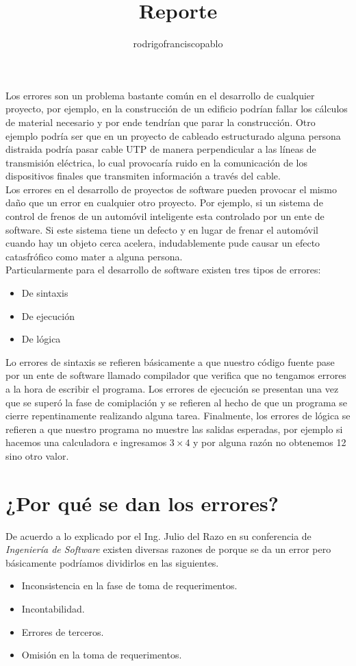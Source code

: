 \documentclass{mylib/reporteCorto}
\title{Reporte}
\author{rodrigofranciscopablo }
\begin{document}
\coverPage

Los errores son un problema bastante común en el desarrollo de cualquier proyecto, por ejemplo, en la construcción de un edificio podrían fallar los cálculos de material necesario y por ende tendrían que parar la construcción. Otro ejemplo podría ser que en un proyecto de cableado estructurado alguna persona distraida podría pasar cable UTP de manera perpendicular a las líneas de transmisión eléctrica, lo cual provocaría ruido en la comunicación de los dispositivos finales que transmiten información a través del cable.\\

Los errores en el desarrollo de proyectos de software pueden provocar el mismo daño que un error en cualquier otro proyecto. Por ejemplo, si un sistema de control de frenos de un automóvil inteligente esta controlado por un ente de software. Si este sistema tiene un defecto y en lugar de frenar el automóvil cuando hay un objeto cerca acelera, indudablemente pude causar un efecto catasfrófico como mater a alguna persona.\\

Particularmente para el desarrollo de software existen tres tipos de errores:
\begin{itemize}
	\item De sintaxis
	\item De ejecución
	\item De lógica
\end{itemize}

Lo errores de sintaxis se refieren básicamente a que nuestro código fuente pase por un ente de software llamado compilador que verifica que no tengamos errores a la hora de escribir el programa. Los errores de ejecución se presentan una vez que se superó la fase de comiplación y se refieren al hecho de que un programa se cierre repentinamente realizando alguna tarea. Finalmente, los errores de lógica se refieren a que nuestro programa no muestre las salidas esperadas, por ejemplo si hacemos una calculadora e ingresamos $3 \times 4 $ y por alguna razón no obtenemos 12 sino otro valor.

\section*{¿Por qué se dan los errores?}

De acuerdo a lo explicado por el Ing. Julio del Razo en su conferencia de \textit{Ingeniería de Software} existen diversas razones de porque se da un error pero básicamente podríamos dividirlos en las siguientes.
\begin{itemize}
	\item Inconsistencia en la fase de toma de requerimentos.
	\item Incontabilidad.
	\item Errores de terceros.
	\item Omisión en la toma de requerimentos.
\end{itemize}	
\end{document}
